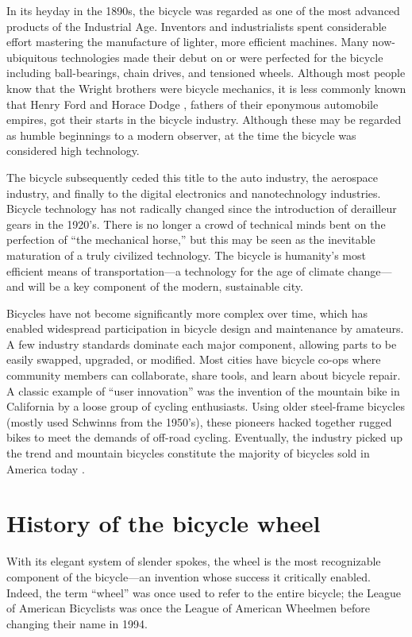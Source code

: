 \documentclass[../thesis.tex]{subfiles}
\begin{document}
In its heyday in the 1890s, the bicycle was regarded as one of the most advanced products of the Industrial Age. Inventors and industrialists spent considerable effort mastering the manufacture of lighter, more efficient machines. Many now-ubiquitous technologies made their debut on or were perfected for the bicycle including ball-bearings, chain drives, and tensioned wheels. Although most people know that the Wright brothers were bicycle mechanics, it is less commonly known that Henry Ford and Horace Dodge \cite{Reid2015}, fathers of their eponymous automobile empires, got their starts in the bicycle industry. Although these may be regarded as humble beginnings to a modern observer, at the time the bicycle was considered high technology.

The bicycle subsequently ceded this title to the auto industry, the aerospace industry, and finally to the digital electronics and nanotechnology industries. Bicycle technology has not radically changed since the introduction of derailleur gears in the 1920’s. There is no longer a crowd of technical minds bent on the perfection of ``the mechanical horse,'' but this may be seen as the inevitable maturation of a truly civilized technology. The bicycle is humanity's most efficient means of transportation---a technology for the age of climate change---and will be a key component of the modern, sustainable city.

Bicycles have not become significantly more complex over time, which has enabled widespread participation in bicycle design and maintenance by amateurs. A few industry standards dominate each major component, allowing parts to be easily swapped, upgraded, or modified. Most cities have bicycle co-ops where community members can collaborate, share tools, and learn about bicycle repair. A classic example of “user innovation” was the invention of the mountain bike in California by a loose group of cycling enthusiasts. Using older steel-frame bicycles (mostly used Schwinns from the 1950’s), these pioneers hacked together rugged bikes to meet the demands of off-road cycling. Eventually, the industry picked up the trend and mountain bicycles constitute the majority of bicycles sold in America today \cite{Crown1996}.


\section{History of the bicycle wheel}
With its elegant system of slender spokes, the wheel is the most recognizable component of the bicycle---an invention whose success it critically enabled. Indeed, the term ``wheel'' was once used to refer to the entire bicycle; the League of American Bicyclists was once the League of American Wheelmen before changing their name in 1994.
\end{document}
